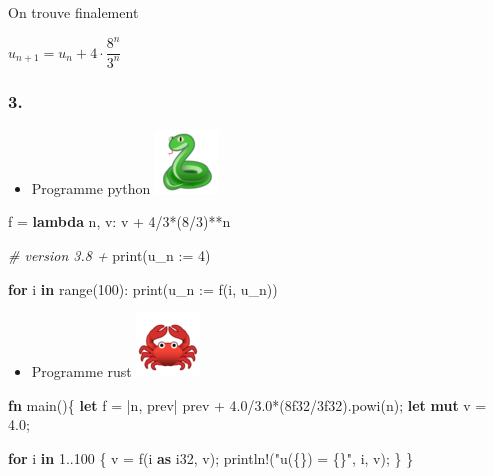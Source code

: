 \documentclass[]{scrartcl}
\newenvironment{Shaded}{}{}
\newcommand{\BuiltInTok}[1]{#1}
\newcommand{\CommentTok}[1]{\textcolor[rgb]{0.38,0.63,0.69}{\textit{#1}}}
\newcommand{\ControlFlowTok}[1]{\textcolor[rgb]{0.00,0.44,0.13}{\textbf{#1}}}
\newcommand{\DataTypeTok}[1]{\textcolor[rgb]{0.56,0.13,0.00}{#1}}
\newcommand{\DecValTok}[1]{\textcolor[rgb]{0.25,0.63,0.44}{#1}}
\newcommand{\KeywordTok}[1]{\textcolor[rgb]{0.00,0.44,0.13}{\textbf{#1}}}
\newcommand{\NormalTok}[1]{#1}
\newcommand{\OperatorTok}[1]{\textcolor[rgb]{0.40,0.40,0.40}{#1}}
\newcommand{\PreprocessorTok}[1]{\textcolor[rgb]{0.74,0.48,0.00}{#1}}
\newcommand{\StringTok}[1]{\textcolor[rgb]{0.25,0.44,0.63}{#1}}
\providecommand{\tightlist}{%
  \setlength{\itemsep}{0pt}\setlength{\parskip}{0pt}}
\begin{document}
On trouve finalement

\(u_{n+1} = u_n + 4\cdot \dfrac{8^n}{3^n}\)

\hypertarget{section-4}{%
\subsubsection{3.}\label{section-4}}

\begin{itemize}
\tightlist
\item
  Programme python
  \vspace{-1mm}\includegraphics[scale=0.25]{images/snake.png}
\end{itemize}

\begin{Shaded}
\begin{Highlighting}[]
\NormalTok{f }\OperatorTok{=} \KeywordTok{lambda}\NormalTok{ n, v: v }\OperatorTok{+} \DecValTok{4}\OperatorTok{/}\DecValTok{3}\OperatorTok{*}\NormalTok{(}\DecValTok{8}\OperatorTok{/}\DecValTok{3}\NormalTok{)}\OperatorTok{**}\NormalTok{n}


\CommentTok{# version 3.8 +}
\BuiltInTok{print}\NormalTok{(u_n :}\OperatorTok{=} \DecValTok{4}\NormalTok{)}


\ControlFlowTok{for}\NormalTok{ i }\KeywordTok{in} \BuiltInTok{range}\NormalTok{(}\DecValTok{100}\NormalTok{):}
    \BuiltInTok{print}\NormalTok{(u_n :}\OperatorTok{=}\NormalTok{ f(i, u_n))}
\end{Highlighting}
\end{Shaded}

\begin{itemize}
\tightlist
\item
  Programme rust
  \vspace{-1mm}\includegraphics[scale=0.25]{images/crab.png}
\end{itemize}

\begin{Shaded}
\begin{Highlighting}[]
\KeywordTok{fn}\NormalTok{ main()}\OperatorTok{\{}
    \KeywordTok{let}\NormalTok{ f = |n, prev| prev + }\DecValTok{4.0}\NormalTok{/}\DecValTok{3.0}\NormalTok{*(}\DecValTok{8}\NormalTok{f32/}\DecValTok{3}\NormalTok{f32).powi(n);}
    \KeywordTok{let} \KeywordTok{mut}\NormalTok{ v = }\DecValTok{4.0}\NormalTok{;}

    \KeywordTok{for}\NormalTok{ i }\KeywordTok{in} \DecValTok{1.}\NormalTok{.}\DecValTok{100} \OperatorTok{\{}
\NormalTok{      v = f(i }\KeywordTok{as} \DataTypeTok{i32}\NormalTok{, v);}
      \PreprocessorTok{println!}\NormalTok{(}\StringTok{"u(\{\}) = \{\}"}\NormalTok{, i, v);}
   \OperatorTok{\}}
\OperatorTok{\}}
\end{Highlighting}
\end{Shaded}
\end{document}

